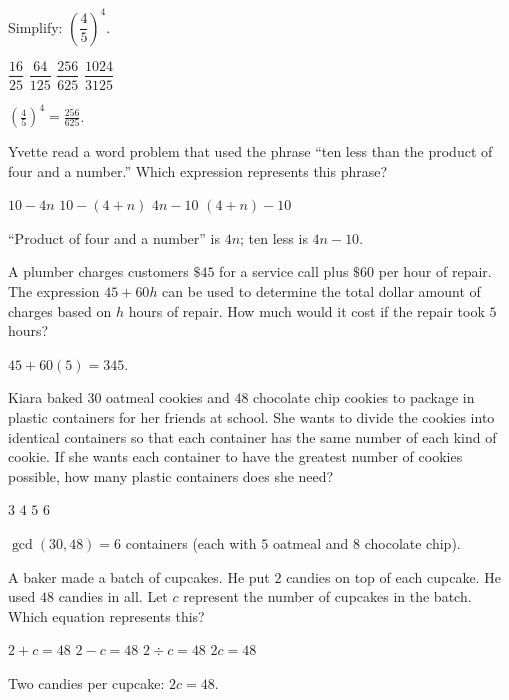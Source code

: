 \question[5]
Simplify: $\left(\dfrac{4}{5}\right)^{4}$.
\begin{choices}
  \choice $\dfrac{16}{25}$
  \choice $\dfrac{64}{125}$
  \CorrectChoice $\dfrac{256}{625}$
  \choice $\dfrac{1024}{3125}$
\end{choices}
\begin{solution}
  $\left(\frac{4}{5}\right)^{4}=\frac{256}{625}$.
\end{solution}

\question[5]
Yvette read a word problem that used the phrase ``ten less than the product of four and a number.'' Which expression represents this phrase?
\begin{choices}
  \choice $10-4n$
  \choice $10-(4+n)$
  \CorrectChoice $4n-10$
  \choice $(4+n)-10$
\end{choices}
\begin{solution}
  ``Product of four and a number'' is $4n$; ten less is $4n-10$.
\end{solution}

\question[5]
A plumber charges customers $\$45$ for a service call plus $\$60$ per hour of repair. The expression $45+60h$ can be used to determine the total dollar amount of charges based on $h$ hours of repair. How much would it cost if the repair took $5$ hours?
\begin{solution}
  $45+60(5)=345$.
\end{solution}

\question[5]
Kiara baked $30$ oatmeal cookies and $48$ chocolate chip cookies to package in plastic containers for her friends at school. She wants to divide the cookies into identical containers so that each container has the same number of each kind of cookie. If she wants each container to have the greatest number of cookies possible, how many plastic containers does she need?
\begin{choices}
  \choice $3$
  \choice $4$
  \choice $5$
  \CorrectChoice $6$
\end{choices}
\begin{solution}
  $\gcd(30,48)=6$ containers (each with $5$ oatmeal and $8$ chocolate chip).
\end{solution}

\question[5]
A baker made a batch of cupcakes. He put $2$ candies on top of each cupcake. He used $48$ candies in all. Let $c$ represent the number of cupcakes in the batch. Which equation represents this?
\begin{choices}
  \choice $2+c=48$
  \choice $2-c=48$
  \choice $2\div c=48$
  \CorrectChoice $2c=48$
\end{choices}
\begin{solution}
  Two candies per cupcake: $2c=48$.
\end{solution}

